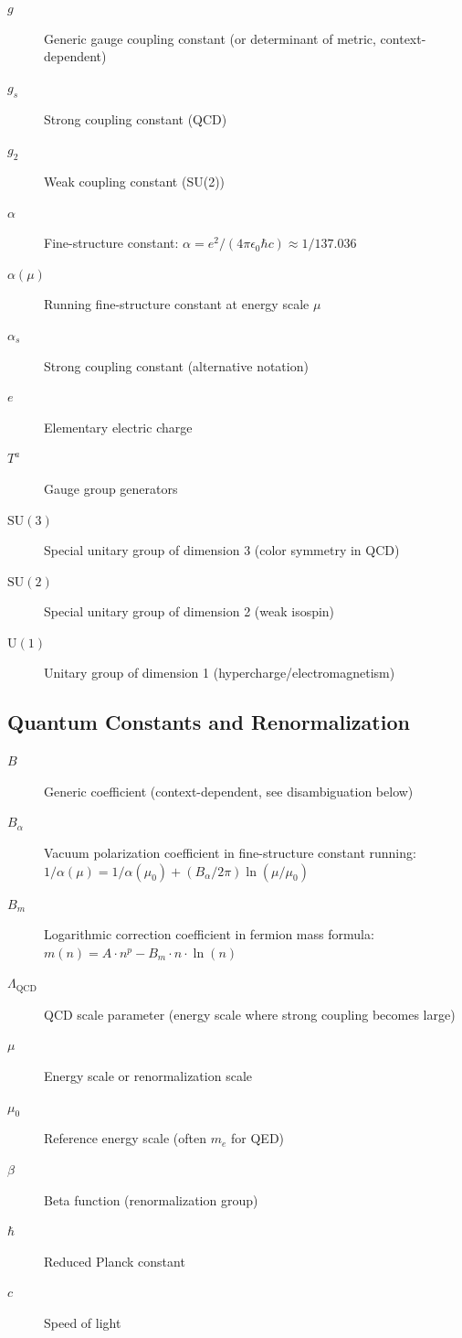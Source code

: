 \begin{description}
\item[$g$] Generic gauge coupling constant (or determinant of metric, context-dependent)
\item[$g_s$] Strong coupling constant (QCD)
\item[$g_2$] Weak coupling constant (SU(2))
\item[$\alpha$] Fine-structure constant: $\alpha = e^2/(4\pi\epsilon_0\hbar c) \approx 1/137.036$
\item[$\alpha(\mu)$] Running fine-structure constant at energy scale $\mu$
\item[$\alpha_s$] Strong coupling constant (alternative notation)
\item[$e$] Elementary electric charge
\item[$T^a$] Gauge group generators
\item[$\text{SU}(3)$] Special unitary group of dimension 3 (color symmetry in QCD)
\item[$\text{SU}(2)$] Special unitary group of dimension 2 (weak isospin)
\item[$\text{U}(1)$] Unitary group of dimension 1 (hypercharge/electromagnetism)
\end{description}

\subsection{Quantum Constants and Renormalization}

\begin{description}
\item[$B$] Generic coefficient (context-dependent, see disambiguation below)
\item[$B_\alpha$] Vacuum polarization coefficient in fine-structure constant running: $1/\alpha(\mu) = 1/\alpha(\mu_0) + (B_\alpha/2\pi)\ln(\mu/\mu_0)$
\item[$B_m$] Logarithmic correction coefficient in fermion mass formula: $m(n) = A \cdot n^p - B_m \cdot n \cdot \ln(n)$
\item[$\Lambda_{\text{QCD}}$] QCD scale parameter (energy scale where strong coupling becomes large)
\item[$\mu$] Energy scale or renormalization scale
\item[$\mu_0$] Reference energy scale (often $m_e$ for QED)
\item[$\beta$] Beta function (renormalization group)
\item[$\hbar$] Reduced Planck constant
\item[$c$] Speed of light
\end{description}

